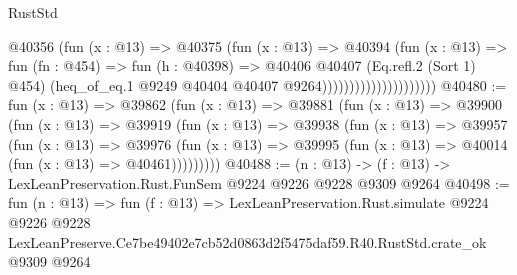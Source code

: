 \begin{lexlean}{RustStd}
\begin{coremodule}
                                    @40356
                                      (fun (x : @13) =>
                                      @40375
                                        (fun (x : @13) =>
                                        @40394
                                          (fun (x : @13) =>
                                          fun (fn : @454) =>
                                          fun (h : @40398) =>
                                          @40406
                                            @40407
                                            (Eq.refl.{2} (Sort 1) @454)
                                            (heq_of_eq.{1}
                                              @9249
                                              @40404
                                              @40407
                                              @9264)))))))))))))))))))))
@40480 := fun (x : @13) =>
  @39862
    (fun (x : @13) =>
    @39881
      (fun (x : @13) =>
      @39900
        (fun (x : @13) =>
        @39919
          (fun (x : @13) =>
          @39938
            (fun (x : @13) =>
            @39957
              (fun (x : @13) =>
              @39976
                (fun (x : @13) => @39995 (fun (x : @13) => @40014 (fun (x : @13) => @40461)))))))))
@40488 := (n : @13) -> (f : @13) -> LexLeanPreservation.Rust.FunSem @9224 @9226 @9228 @9309 @9264
@40498 := fun (n : @13) =>
  fun (f : @13) =>
  LexLeanPreservation.Rust.simulate
    @9224
    @9226
    @9228
    LexLeanPreserve.Ce7be49402e7cb52d0863d2f5475daf59.R40.RustStd.crate_ok
    @9309
    @9264
\end{coremodule}
\end{lexlean}
